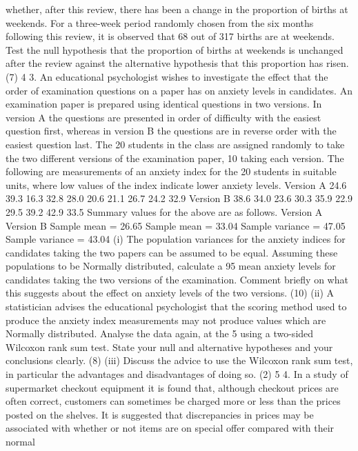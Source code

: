whether, after this review, there has been a change in the proportion of births at
weekends. For a three-week period randomly chosen from the six months
following this review, it is observed that 68 out of 317 births are at weekends.
Test the null hypothesis that the proportion of births at weekends is unchanged
after the review against the alternative hypothesis that this proportion has risen.
(7)
4
3. An educational psychologist wishes to investigate the effect that the order of
examination questions on a paper has on anxiety levels in candidates. An examination
paper is prepared using identical questions in two versions. In version A the questions
are presented in order of difficulty with the easiest question first, whereas in version B
the questions are in reverse order with the easiest question last.
The 20 students in the class are assigned randomly to take the two different versions of
the examination paper, 10 taking each version. The following are measurements of an
anxiety index for the 20 students in suitable units, where low values of the index
indicate lower anxiety levels.
Version A 24.6 39.3 16.3 32.8 28.0 20.6 21.1 26.7 24.2 32.9
Version B 38.6 34.0 23.6 30.3 35.9 22.9 29.5 39.2 42.9 33.5
Summary values for the above are as follows.
Version A Version B
Sample mean = 26.65 Sample mean = 33.04
Sample variance = 47.05 Sample variance = 43.04
(i) The population variances for the anxiety indices for candidates taking the two
papers can be assumed to be equal. Assuming these populations to be
Normally distributed, calculate a 95%
mean anxiety levels for candidates taking the two versions of the examination.
Comment briefly on what this suggests about the effect on anxiety levels of the
two versions.
(10)
(ii) A statistician advises the educational psychologist that the scoring method used
to produce the anxiety index measurements may not produce values which are
Normally distributed. Analyse the data again, at the 5%
using a two-sided Wilcoxon rank sum test. State your null and alternative
hypotheses and your conclusions clearly.
(8)
(iii) Discuss the advice to use the Wilcoxon rank sum test, in particular the
advantages and disadvantages of doing so.
(2)
5
4. In a study of supermarket checkout equipment it is found that, although checkout
prices are often correct, customers can sometimes be charged more or less than the
prices posted on the shelves. It is suggested that discrepancies in prices may be
associated with whether or not items are on special offer compared with their normal
